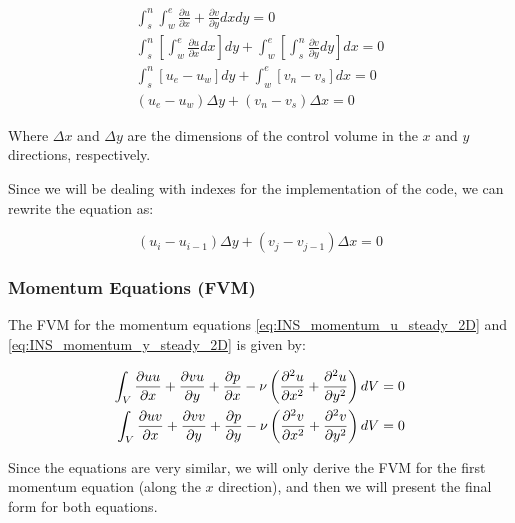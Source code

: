 \begin{gather}
    \int_{s}^{n} \int_{w}^{e} \frac{\partial u}{\partial x} + \frac{\partial v}{\partial y} dxdy = 0 \\
    \int_{s}^{n} \left[\int_{w}^{e} \frac{\partial u}{\partial x} dx \right] dy + \int_{w}^{e} \left[\int_{s}^{n} \frac{\partial v}{\partial y} dy \right] dx = 0 \\
    \int_{s}^{n} \left[ u_e - u_w \right] dy + \int_{w}^{e} \left[ v_n - v_s \right] dx = 0 \\
    (u_e - u_w) \Delta y + (v_n - v_s) \Delta x = 0
\end{gather}

Where $\Delta x$ and $\Delta y$ are the dimensions of the control volume in the $x$ and $y$ directions, respectively.

Since we will be dealing with indexes for the implementation of the code, we can rewrite the equation as:

\begin{equation}
    (u_{i} - u_{i-1}) \Delta y + (v_{j} - v_{j-1}) \Delta x = 0
    \label{eq:INS_steady_2D_discretized_continuity_final}
\end{equation}



\subsubsection{Momentum Equations (FVM)}

The FVM for the momentum equations \ref{eq:INS_momentum_u_steady_2D} and \ref{eq:INS_momentum_y_steady_2D} is given by:

\begin{align}
    \label{eq:INS_steady_x_momentum_FVM}
    \int_{V} \frac{\partial u u}{\partial x} + \frac{\partial v u}{\partial y} + \frac{\partial p}{\partial x} - \nu \left( \frac{\partial^2 u}{\partial x^2} + \frac{\partial^2 u}{\partial y^2} \right) \space dV & = 0 \\
    \label{eq:INS_steady_y_momentum_FVM}
    \int_{V} \frac{\partial u v}{\partial x} + \frac{\partial v v}{\partial y} + \frac{\partial p}{\partial y} - \nu \left( \frac{\partial^2 v}{\partial x^2} + \frac{\partial^2 v}{\partial y^2} \right) \space dV & = 0
\end{align}

Since the equations are very similar, we will only derive the FVM for the first momentum equation (along the $x$ direction), and then we will present the final form for both equations.


